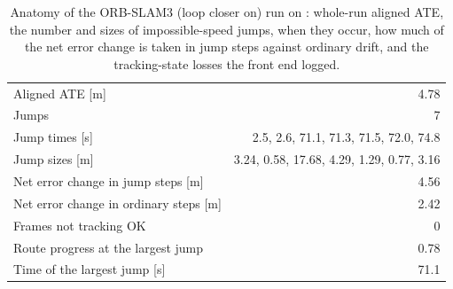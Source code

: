 \begin{table}[htbp]
\centering
\small
\caption[Anatomy of the ORB-SLAM3 failure on the I layout.]{Anatomy of the ORB-SLAM3 (loop closer on) run on : whole-run aligned ATE, the number and sizes of impossible-speed jumps, when they occur, how much of the net error change is taken in jump steps against ordinary drift, and the tracking-state losses the front end logged.}
\label{tab:e1i-orbfail}
\begin{tabular}{lr}
\toprule
Aligned ATE [m] & 4.78 \\
Jumps & 7 \\
Jump times [s] & 2.5, 2.6, 71.1, 71.3, 71.5, 72.0, 74.8 \\
Jump sizes [m] & 3.24, 0.58, 17.68, 4.29, 1.29, 0.77, 3.16 \\
Net error change in jump steps [m] & 4.56 \\
Net error change in ordinary steps [m] & 2.42 \\
Frames not tracking OK & 0 \\
Route progress at the largest jump & 0.78 \\
Time of the largest jump [s] & 71.1 \\
\bottomrule
\end{tabular}
\end{table}
